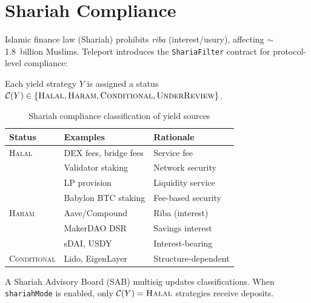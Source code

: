 \section{Shariah Compliance}

\label{sec:shariah}

Islamic finance law (Shariah) prohibits \emph{riba} (interest/usury), affecting $\sim$1.8~billion Muslims. Teleport introduces the \texttt{ShariaFilter} contract for protocol-level compliance:

\begin{definition}
Each yield strategy $Y$ is assigned a status $\mathcal{C}(Y) \in \{\textsc{Halal}, \textsc{Haram}, \textsc{Conditional}, \textsc{UnderReview}\}$.
\end{definition}

\begin{table}[h]
\centering
\small
\begin{tabular}{lll}
\toprule
\textbf{Status} & \textbf{Examples} & \textbf{Rationale} \\
\midrule
\textsc{Halal} & DEX fees, bridge fees & Service fee \\
& Validator staking & Network security \\
& LP provision & Liquidity service \\
& Babylon BTC staking & Fee-based security \\
\midrule
\textsc{Haram} & Aave/Compound & Riba (interest) \\
& MakerDAO DSR & Savings interest \\
& sDAI, USDY & Interest-bearing \\
\midrule
\textsc{Conditional} & Lido, EigenLayer & Structure-dependent \\
\bottomrule
\end{tabular}
\caption{Shariah compliance classification of yield sources}
\label{tab:shariah}
\end{table}

A Shariah Advisory Board (SAB) multisig updates classifications. When \texttt{shariahMode} is enabled, only $\mathcal{C}(Y) = \textsc{Halal}$ strategies receive deposits.

